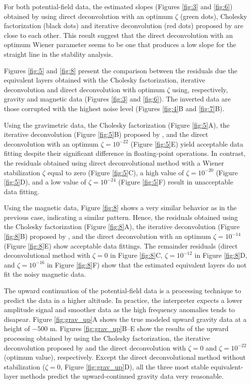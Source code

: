 For both potential-field data, the estimated slopes (Figures \ref{fig:3} and \ref{fig:6}) obtained by using direct deconvolution with an optimum $\zeta$ (green dots), Cholesky factorization (black dots) and iterative deconvolution (red dots) proposed by \cite{takahashi-etal2020} are close to each other.
This result suggest that the direct deconvolution with an optimum Wiener parameter seems to be one that produces a low slope for the straight line in the stability analysis.

Figures \ref{fig:5} and \ref{fig:8} present the comparison between the residuals due the equivalent layers obtained with the Cholesky factorization, 
iterative deconvolution and direct deconvolution with optimum $\zeta$ using, respectively, gravity and magnetic data (Figures \ref{fig:3} and \ref{fig:6}).
The inverted data are those corrupted with the highest noise level (Figures \ref{fig:4}B and \ref{fig:7}B).

Using the gravimetric data, the Cholesky factorization (Figure \ref{fig:5}A), the iterative deconvolution (Figure \ref{fig:5}B) proposed by \cite{takahashi-etal2020}, and the direct deconvolution with an optimum $\zeta = 10^{-22}$ (Figure \ref{fig:5}E) yield acceptable data fitting despite their significant difference in floating-point operations.
In contrast, the residuals obtained using direct deconvolutional method with a Wiener stabilization  $\zeta$ equal to 
zero (Figure \ref{fig:5}C), 
a high value of $\zeta = 10^{-20}$ (Figure \ref{fig:5}D), and 
a low value of  $\zeta = 10^{-24}$ (Figure \ref{fig:5}F)
result in unacceptable data fitting.

Using the magnetic data, Figure \ref{fig:8} shows a very similar behavior 
as in the previous case, indicating a similar pattern.
Hence, the residuals obtained using the Cholesky factorization 
(Figure \ref{fig:8}A), the iterative deconvolution (Figure \ref{fig:8}B) proposed by \cite{takahashi-etal2020}, and the direct deconvolution with an optimum $\zeta = 10^{-14}$ (Figure \ref{fig:8}E) show acceptable data fittings. 
The remainder residuals (direct deconvolutional method with $\zeta =0$ 
in Figure \ref{fig:8}C, $\zeta = 10^{-12}$ in Figure \ref{fig:8}D, and 
$\zeta = 10^{-16}$ in Figure \ref{fig:8}F) show that the estimated equivalent layers do not fit the noisy magnetic data.

The upward continuation of the potential-field data is a processing technique to predict the data in a higher altitude. 
In practice, the interpreter expects a lower amplitude signal and smoother data as the high frequency anomalies tends to disapear. 
Figure  \ref{fig:grav_up}A shows the true modeled upward gravity data at a height of $-500$ m. 
Figures \ref{fig:grav_up}B--E show the results of the upward processing obtained by using the Cholesky factorization,  the iterative deconvolution proposed by \cite{takahashi-etal2020} and the direct deconvolution with $\zeta = 0$ and $\zeta = 10^{-22}$ (optimum value), respectively.
Except the direct deconvolutional method without stabilization ($\zeta = 0$, Figure \ref{fig:grav_up}D), all the three most stable equivalent-layer methods predict the upward-continued gravity data very reasonable.

